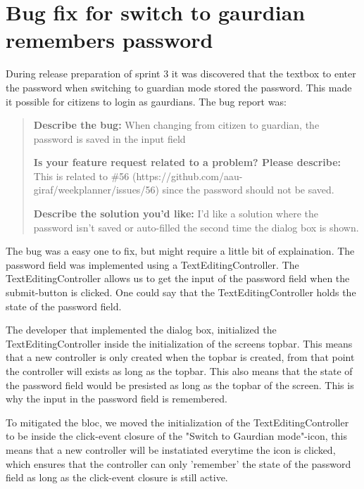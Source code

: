 \section{Bug fix for switch to gaurdian remembers password}
During release preparation of sprint 3 it was discovered that the textbox to enter the password when switching to guardian mode stored the password. This made it possible for citizens to login as gaurdians. The bug report was:

\begin{quote}
  \textbf{Describe the bug:} When changing from citizen to guardian, the password is saved in the input field

  \textbf{Is your feature request related to a problem? Please describe:} This is related to \#56 (https://github.com/aau-giraf/weekplanner/issues/56) since the password should not be saved.

  \textbf{Describe the solution you'd like: } I'd like a solution where the password isn't saved or auto-filled the second time the dialog box is shown.
\end{quote}

The bug was a easy one to fix, but might require a little bit of explaination. The password field was implemented using a TextEditingController. The TextEditingController allows us to get the input of the password field when the submit-button is clicked. One could say that the TextEditingController holds the state of the password field.

The developer that implemented the dialog box, initialized the TextEditingController inside the initialization of the screens topbar. This means that a new controller is only created when the topbar is created, from that point the controller will exists as long as the topbar. This also means that the state of the password field would be presisted as long as the topbar of the screen. This is why the input in the password field is remembered.

To mitigated the bloc, we moved the initialization of the TextEditingController to be inside the click-event closure of the "Switch to Gaurdian mode"-icon, this means that a new controller will be instatiated everytime the icon is clicked, which ensures that the controller can only 'remember' the state of the password field as long as the click-event closure is still active.
